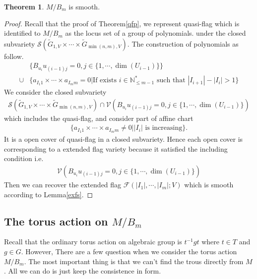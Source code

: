 \documentclass[10pt,UTF8]{article}
\theoremstyle{definition}
\newtheorem{theorem}[definition]{Theorem}
\newtheorem*{proof}{Proof}
\begin{document}
\begin{theorem}
  $M/B_m$ is smooth.
\end{theorem}
\begin{proof}
  Recall that the proof of Theorem\ref{qfp}, we represent quasi-flag which is identified to $M/B_m$ as the locus set of a group of polynomials. 
  under the closed subvariety $\mathscr{S}(\tilde{G}_{1,V}\times\cdots\times \tilde{G}_{\min(n,m),V}) $. The construction of polynomials as follow.
  \begin{align*}
    &\{B_{u_i} u_{(i-1)j}=0 ,j\in\{1,\cdots,\dim(U_{i-1})\} \} \\
    \cup&\{a_{{I_1}1}\times\cdots\times a_{{I_m}m} = 0|\text{If exists $i\in \mathbb{N}^*_{\le m-1}$ such that $|I_{i+1}|-|I_{i}|>1$}\}
  \end{align*}
  We consider the closed subvariety 
  \begin{align*}
    \mathscr{S}(\tilde{G}_{1,V}\times\cdots\times \tilde{G}_{\min(n,m),V})  \cap 
    \mathcal{V}(B_{u_i} u_{(i-1)j}=0 ,j\in\{1,\cdots,\dim(U_{i-1})\})
  \end{align*}
  which includes the quasi-flag, and consider part of affine chart  
  \begin{align*}
    \{a_{{I_1}1}\times\cdots\times a_{{I_m}m} \neq 0|\text{$|I_i|$ is increasing} \}.
  \end{align*}
  It is a open cover of quasi-flag in a closed subvariety. Hence each open cover is corresponding to 
  a extended flag variety because it satisfied the including condition i.e. 
  \begin{align*}
    \mathcal{V}(B_{u_i} u_{(i-1)j}=0 ,j\in\{1,\cdots,\dim(U_{i-1})\})
  \end{align*}
  Then we can recover the extended flag $\mathcal{F}(|I_1|,\cdots,|I_m|;V)$ which is smooth according to Lemma\ref{exfs}.
\end{proof}


\subsection{The torus action on $M/B_m$}

Recall that the ordinary torus action on algebraic group is $t^{-1}gt$ where $t\in T$ and $g\in G$.
However, There are a few question when we consider the torus action $M/B_m$. The most important thing is that we can't find the trous directly from $M$.
All we can do is just keep the consistence in form.
 
\end{document}
